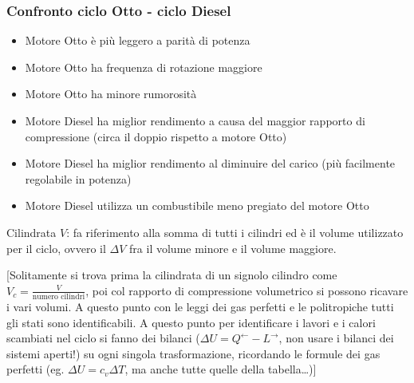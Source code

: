 \subsubsection{Confronto ciclo Otto - ciclo Diesel}
\begin{itemize}
    \item Motore Otto è più leggero a parità di potenza
    \item Motore Otto ha frequenza di rotazione maggiore
    \item Motore Otto ha minore rumorosità
    \item Motore Diesel ha miglior rendimento a causa del maggior rapporto di compressione (circa il doppio rispetto a motore Otto)
    \item Motore Diesel ha miglior rendimento al diminuire del carico (più facilmente regolabile in potenza)
    \item Motore Diesel utilizza un combustibile meno pregiato del motore Otto
\end{itemize}

Cilindrata $V$: fa riferimento alla somma di tutti i cilindri ed è il volume utilizzato per il ciclo, ovvero il $\Delta V$ fra il volume minore e il volume maggiore.

[Solitamente si trova prima la cilindrata di un signolo cilindro come $V_c = \frac{V}{\text{numero cilindri}}$, poi col rapporto di compressione volumetrico si possono ricavare i vari volumi. A questo punto con le leggi dei gas perfetti e le politropiche tutti gli stati sono identificabili.
A questo punto per identificare i lavori e i calori scambiati nel ciclo si fanno dei bilanci ($\Delta U = Q^{\leftarrow } - L^{\rightarrow }$, non usare i bilanci dei sistemi aperti!) su ogni singola trasformazione, ricordando le formule dei gas perfetti (eg. $\Delta U = c_v \Delta T$, ma anche tutte quelle della tabella\dots)]